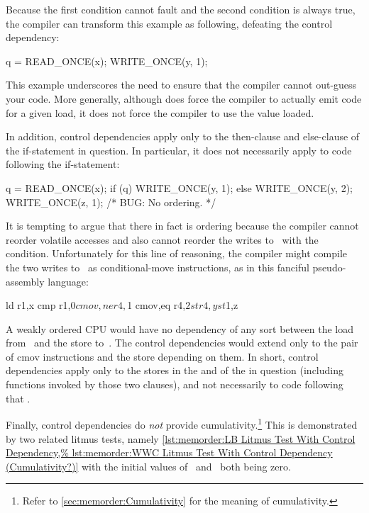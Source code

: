 Because the first condition cannot fault and the second condition is
always true, the compiler can transform this example as following,
defeating the control dependency:

\begin{VerbatimN}
q = READ_ONCE(x);
WRITE_ONCE(y, 1);
\end{VerbatimN}

This example underscores the need to ensure that the compiler cannot
out-guess your code.
More generally, although  does force
the compiler to actually emit code for a given load, it does not force
the compiler to use the value loaded.

In addition, control dependencies apply only to the then-clause and
else-clause of the if-statement in question.
In particular, it does
not necessarily apply to code following the if-statement:

\begin{VerbatimN}
q = READ_ONCE(x);
if (q) {
	WRITE_ONCE(y, 1);
} else {
	WRITE_ONCE(y, 2);
}
WRITE_ONCE(z, 1);  /* BUG: No ordering. */
\end{VerbatimN}

It is tempting to argue that there in fact is ordering because the
compiler cannot reorder volatile accesses and also cannot reorder
the writes to~ with the condition.
Unfortunately for this line
of reasoning, the compiler might compile the two writes to~ as
conditional-move instructions, as in this fanciful pseudo-assembly
language:

\begin{VerbatimN}
ld r1,x
cmp r1,$0
cmov,ne r4,$1
cmov,eq r4,$2
st r4,y
st $1,z
\end{VerbatimN}

A weakly ordered CPU would have no dependency of any sort between the load
from~ and the store to~.
The control dependencies would extend
only to the pair of cmov instructions and the store depending on them.
In short, control dependencies apply only to the stores in the 
and  of the  in question (including functions invoked by
those two clauses), and not necessarily to code following that .

Finally, control dependencies do \emph{not} provide cumulativity.\footnote{
	Refer to \cref{sec:memorder:Cumulativity} for
	the meaning of cumulativity.}
This is demonstrated by two related litmus tests, namely
\cref{lst:memorder:LB Litmus Test With Control Dependency,%
lst:memorder:WWC Litmus Test With Control Dependency (Cumulativity?)}
with the initial values
of~ and~ both being zero.

